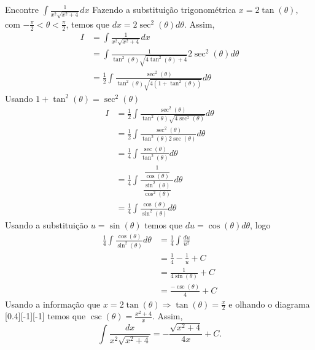 \begin{example}
  Encontre \(\int \frac{1}{x^2\sqrt{x^2+4}}dx\)
  \solution
  Fazendo a substituição trigonométrica
  $x=2\tan(\theta)$, com $-\frac{\pi}{2}< \theta < \frac{\pi}{2}$,
  temos que $dx=2\sec^2(\theta)d \theta$.
  Assim,
  \begin{align*}
    I
    & = \int \frac{1}{x^2\sqrt{x^2+4}}dx \\
    & = \int \frac{1}{\tan^2(\theta) \sqrt{4\tan^2(\theta)+4}}2\sec^2(\theta) d \theta \\
    & = \frac{1}{2}\int \frac{\sec^2(\theta) }{\tan^2(\theta) \sqrt{4(1+ \tan^2(\theta))}} d\theta
  \end{align*}
  Usando \(1+\tan^2(\theta)= \sec^2(\theta)\)
  \begin{align*}
    I
    & = \frac{1}{2} \int \frac{\sec^2(\theta)}{\tan^2(\theta) \sqrt{4\sec^2(\theta)}} d \theta \\
    & = \frac{1}{2} \int \frac{\sec^2(\theta)}{\tan^2(\theta) 2\sec(\theta)}  d \theta \\
    & = \frac{1}{4} \int \frac{\sec(\theta)}{\tan^2(\theta)} d \theta \\
    & = \frac{1}{4} \int \frac{\;\;\dfrac{1}{\cos(\theta)}\;\;}{\dfrac{\sin^2(\theta)}{\cos^2(\theta)}} d\theta \\
    & = \frac{1}{4} \int \frac{\cos(\theta)}{\sin^2(\theta)} d \theta
  \end{align*}
  Usando a substituição $u=\sin(\theta)$ temos que
  $du=\cos(\theta) d\theta$, logo
  \begin{align*}
    \frac{1}{4} \int \frac{\cos(\theta)}{\sin^2(\theta)} d \theta
    & = \frac{1}{4} \int \frac{du}{u^2} \\
    & = \frac{1}{4} - \frac{1}{u}+C \\
    & = \frac{1}{4\sin(\theta)} + C \\
    & = \frac{-\csc(\theta)}{4}+ C
  \end{align*}
  Usando a informação que $x= 2 \tan(\theta) \Rightarrow \tan(\theta)= \frac{x}{2}$
  e olhando o diagrama
  [0.4][-1][-1]
  temos que $\csc(\theta)=\frac{x^2+4}{x}$.
  Assim,
  \[
    \int \frac{dx}{x^2\sqrt{x^2+4}} =- \frac{\sqrt{x^2+4}}{4x}+C.
  \]
\end{example}


